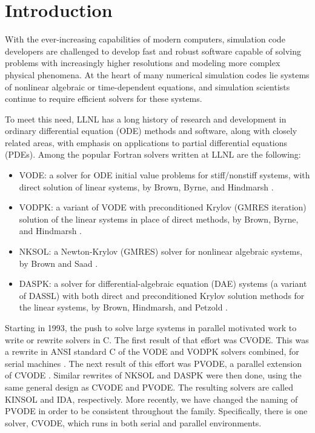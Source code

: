 \section{Introduction}

With the ever-increasing capabilities of modern computers, simulation 
code developers are challenged to develop fast and robust software 
capable of solving problems with increasingly higher resolutions and 
modeling more complex 
physical phenomena.  At the heart of many numerical simulation codes
lie systems of nonlinear algebraic or time-dependent equations, and 
simulation scientists continue to require efficient solvers for these 
systems.  

To meet this need, LLNL has a long history of research and 
development in ordinary
differential equation (ODE) methods and software, along with closely related
areas, with emphasis on applications to partial differential equations
(PDEs).  Among the popular Fortran solvers written at LLNL are the
following:
\begin{itemize}
\item VODE: a solver for ODE initial value problems for stiff/nonstiff
systems, with direct solution of linear systems, by Brown, Byrne, and
Hindmarsh \cite{BBH:89}.
\item VODPK: a variant of VODE with preconditioned Krylov (GMRES
iteration) solution of the linear systems in place of direct methods,
by Brown, Byrne, and Hindmarsh \cite{Byr:92}.
\item NKSOL: a Newton-Krylov (GMRES) solver for nonlinear algebraic
systems, by Brown and Saad \cite{BrSa:90}.
\item DASPK: a solver for differential-algebraic equation (DAE)
systems (a variant of DASSL) with both direct and preconditioned
Krylov solution methods for the linear systems, by Brown, Hindmarsh,
and Petzold \cite{BHP:94}.
\end{itemize}
Starting in 1993, the push to solve large systems in parallel
motivated work to write or rewrite solvers in C.  The first result of
that effort was CVODE.  This was a rewrite in ANSI standard C of the
VODE and VODPK solvers combined, for serial machines
\cite{CoHi:94,CoHi:96}.  The next result of this effort was PVODE, a
parallel extension of CVODE \cite{ByHi:98,ByHi:99}.
Similar rewrites of NKSOL and DASPK were then done, using the same
general design as CVODE and PVODE.  The resulting solvers are called
KINSOL and IDA, respectively.
More recently, we have changed the naming of PVODE in order
to be consistent throughout the family.  Specifically, there is
one solver, CVODE, which runs in both serial and parallel environments. 

